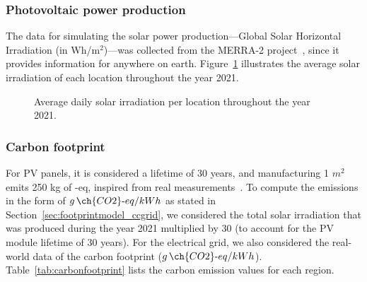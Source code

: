 \subsubsection{Photovoltaic power production}

The data for simulating the solar power production---Global Solar Horizontal Irradiation (in Wh/m$^{2}$)---was collected from the MERRA-2 project~\cite{GELARO2017MERRA2}, since it provides information for anywhere on earth. Figure~\ref{fig:pv_ghi} illustrates the average solar irradiation of each location throughout the year 2021.

 \begin{figure}[h]
  \centering
   {}
  \caption{Average daily solar irradiation per location throughout the year 2021.}
  \label{fig:pv_ghi}
\end{figure}

\subsubsection{Carbon footprint}

For PV panels, it is considered a lifetime of 30 years, and manufacturing 1 $m^2$ emits 250 kg of -eq, inspired from real measurements~\cite{YUE2014pv_carbon}. To compute the emissions in the form of $g\,\ch{CO2}\text{-}eq/kWh$ as stated in Section~\ref{sec:footprintmodel_ccgrid}, we considered the total solar irradiation that was produced during the year 2021 multiplied by 30 (to account for the PV module lifetime of 30 years). For the electrical grid, we also considered the real-world data of the carbon footprint ($g\,\ch{CO2}\text{-}eq/kWh$). Table~\ref{tab:carbonfootprint} lists the carbon emission values for each region.

